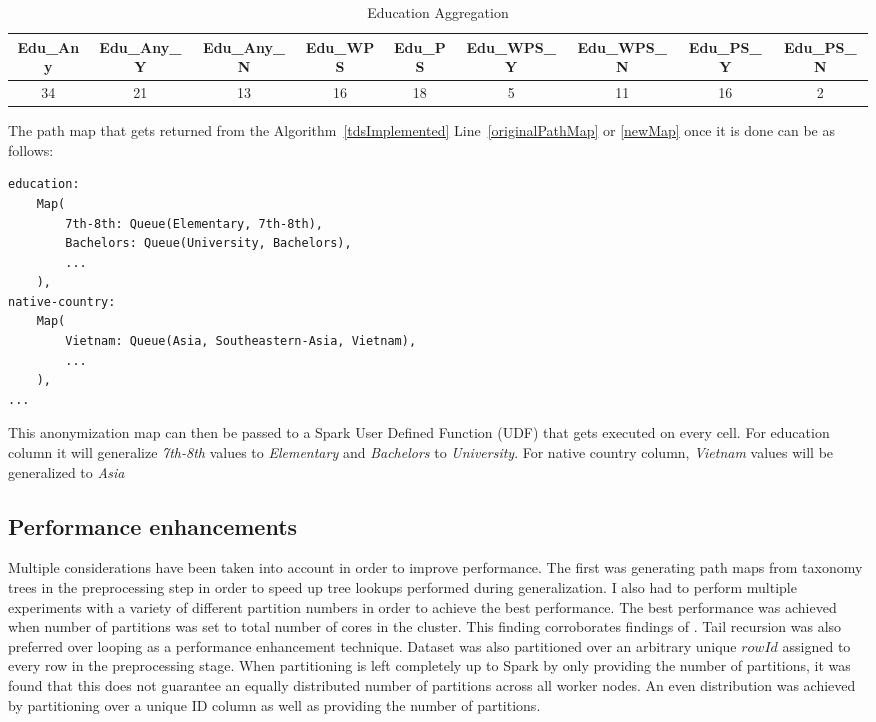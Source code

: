 \documentclass[11pt]{article}       %
\begin{document}
\begin{table}[htp]
\begin{adjustbox}{width=\textwidth, center}
\begin{tabular}{|c|c|c|c|c|c|c|c|c|}
\hline
Edu\_Any & Edu\_Any\_Y & Edu\_Any\_N & Edu\_WPS & Edu\_PS & Edu\_WPS\_Y & Edu\_WPS\_N & Edu\_PS\_Y & Edu\_PS\_N\\
\hline
34 & 21 & 13 & 16 & 18 & 5 & 11 & 16 & 2\\
\hline
\end{tabular}
\end{adjustbox}
\caption{Education Aggregation}
\label{table4}
\end{table}

The path map that gets returned from the Algorithm~\ref{tdsImplemented} Line~\ref{originalPathMap} or \ref{newMap} once it is done can be as follows:

\begin{verbatim}
education:
    Map(
        7th-8th: Queue(Elementary, 7th-8th),
        Bachelors: Queue(University, Bachelors),
        ...
    ),
native-country:
    Map(
        Vietnam: Queue(Asia, Southeastern-Asia, Vietnam),
        ...
    ),
...
\end{verbatim}

This anonymization map can then be passed to a Spark User Defined Function (UDF) that gets executed on every cell. For education column it will generalize \emph{7th-8th} values to \emph{Elementary} and \emph{Bachelors} to \emph{University}. For native country column, \emph{Vietnam} values will be generalized to \emph{Asia}

\subsection{Performance enhancements}

Multiple considerations have been taken into account in order to improve performance. The first was generating path maps from taxonomy trees in the preprocessing step in order to speed up tree lookups performed during generalization. I also had to perform multiple experiments with a variety of different partition numbers in order to achieve the best performance. The best performance was achieved when number of partitions was set to total number of cores in the cluster. This finding corroborates findings of \cite{Sopaoglu:2017}. Tail recursion was also preferred over looping as a performance enhancement technique. Dataset was also partitioned over an arbitrary unique $rowId$ assigned to every row in the preprocessing stage. When partitioning is left completely up to Spark by only providing the number of partitions, it was found that this does not guarantee an equally distributed number of partitions across all worker nodes. An even distribution was achieved by partitioning over a unique ID column as well as providing the number of partitions.
\end{document}
